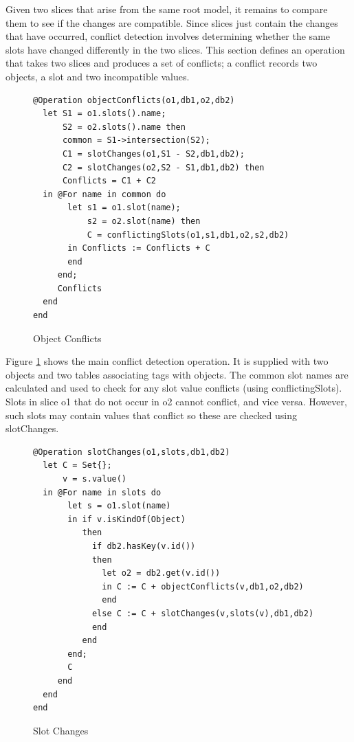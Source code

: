 Given two slices that arise from the same root model, it remains to
compare them to see if the changes are compatible. Since slices just
contain the changes that have occurred, conflict detection involves
determining whether the same slots have changed differently in the
two slices. This section defines an operation that takes two slices
and produces a set of conflicts; a conflict records two objects, a
slot and two incompatible values.

%
\begin{figure}
\hfill{}\begin{lstlisting}
@Operation objectConflicts(o1,db1,o2,db2)
  let S1 = o1.slots().name;
      S2 = o2.slots().name then
      common = S1->intersection(S2);
      C1 = slotChanges(o1,S1 - S2,db1,db2);
      C2 = slotChanges(o2,S2 - S1,db1,db2) then
      Conflicts = C1 + C2
  in @For name in common do
       let s1 = o1.slot(name);
           s2 = o2.slot(name) then
           C = conflictingSlots(o1,s1,db1,o2,s2,db2)
       in Conflicts := Conflicts + C
       end
     end;
     Conflicts
  end
end
\end{lstlisting}\hfill{}

\caption{Object Conflicts\label{fig:Object-Conflicts}}

\end{figure}


Figure \ref{fig:Object-Conflicts} shows the main conflict detection
operation. It is supplied with two objects and two tables associating
tags with objects. The common slot names are calculated and used to
check for any slot value conflicts (using conflictingSlots). Slots
in slice o1 that do not occur in o2 cannot conflict, and vice versa.
However, such slots may contain values that conflict so these are
checked using slotChanges.

%
\begin{figure}
\hfill{}\begin{lstlisting}
@Operation slotChanges(o1,slots,db1,db2)
  let C = Set{};
      v = s.value()
  in @For name in slots do
       let s = o1.slot(name)
       in if v.isKindOf(Object)
          then 
            if db2.hasKey(v.id())
            then
              let o2 = db2.get(v.id())
              in C := C + objectConflicts(v,db1,o2,db2)
              end
            else C := C + slotChanges(v,slots(v),db1,db2)
            end
          end
       end;
       C
     end
  end
end
\end{lstlisting}\hfill{}

\caption{Slot Changes\label{fig:Slot-Changes}}

\end{figure}


